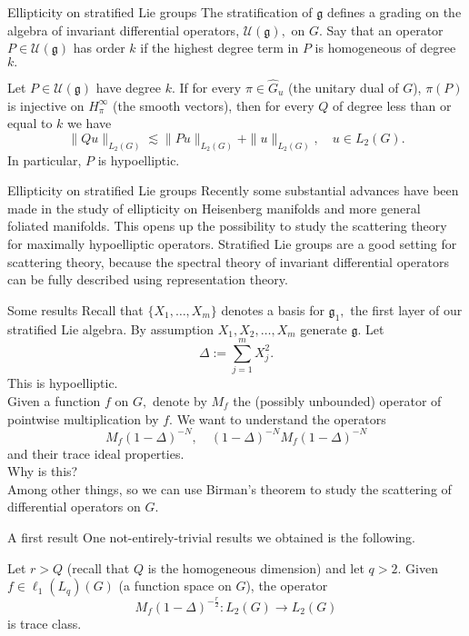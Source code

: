 \documentclass{beamer}
\numberwithin{equation}{section}
\theoremstyle{plain}
\theoremstyle{plain}
\theoremstyle{definition}
\theoremstyle{plain}
\theoremstyle{plain}
\theoremstyle{definition}
\newcommand{\Uc}{\mathcal{U}}
\newcommand{\gf}{\mathfrak{g}}
\begin{document}
\begin{frame}{Ellipticity on stratified Lie groups}
  The stratification of $\gf$ defines a grading on the algebra of invariant differential operators, $\Uc(\gf),$ on $G.$
  Say that an operator $P\in \Uc(\gf)$ has order $k$ if the highest degree term in $P$ is homogeneous of degree $k.$

  \begin{theorem}
    Let $P \in \Uc(\gf)$ have degree $k.$ If for every $\pi \in \widehat{G}_u$ (the unitary dual of $G$), $\pi(P)$
    is injective on $H^{\infty}_\pi$ (the smooth vectors), then for every $Q$ of degree less than or equal to $k$ we have
    \[
      \|Qu\|_{L_2(G)} \lesssim \|Pu\|_{L_2(G)}+\|u\|_{L_2(G)},\quad u\in L_2(G).
    \]
    In particular, $P$ is hypoelliptic.
  \end{theorem}
\end{frame}

\begin{frame}{Ellipticity on stratified Lie groups}
  Recently some substantial advances have been made in the study of ellipticity on Heisenberg manifolds and more general foliated manifolds.
  \pause
  This opens up the possibility to study the scattering theory for maximally hypoelliptic operators.
  \pause
  Stratified Lie groups are a good setting for scattering theory, because the spectral theory of invariant differential operators can be fully described using representation theory.
\end{frame}

\begin{frame}{Some results}
Recall that $\{X_1,\ldots,X_m\}$ denotes a basis for $\gf_1,$ the first layer of our stratified Lie algebra. By assumption $X_1,X_2,\ldots,X_m$ generate $\gf.$ Let
\[
  \Delta := \sum_{j=1}^m X_j^2.
\]
This is hypoelliptic.\\
\pause
Given a function $f$ on $G,$ denote by $M_f$ the (possibly unbounded) operator of pointwise multiplication by $f.$ We want to understand the operators
\[
  M_f(1-\Delta)^{-N},\quad (1-\Delta)^{-N}M_f(1-\Delta)^{-N}
\]
and their trace ideal properties.\\
\pause
Why is this?\\
\pause
Among other things, so we can use Birman's theorem to study the scattering of differential operators on $G.$
\end{frame}

\begin{frame}{A first result}
One not-entirely-trivial results we obtained is the following.
\begin{theorem}
  Let $r>Q$ (recall that $Q$ is the homogeneous dimension) and let $q>2.$ Given $f \in \ell_1(L_q)(G)$ {\color{red}(a function space on $G$)}, the operator
  \[
M_f(1-\Delta)^{-\frac{r}{2}}:L_2(G)\to L_2(G)
  \]
  is trace class.
\end{theorem}
\end{frame}
\end{document}
